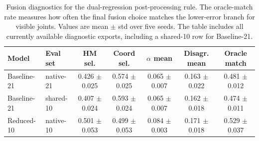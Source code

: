 \documentclass[10pt,letterpaper]{article}
\begin{document}
\begin{table}[H]
\centering
\footnotesize
\caption{Fusion diagnostics for the dual-regression post-processing rule. The oracle-match rate measures how often the final fusion choice matches the lower-error branch for visible joints. Values are mean $\pm$ std over five seeds. The table includes all currently available diagnostic exports, including a shared-10 row for Baseline-21.}
\label{tab:fusion_diagnostics}
\begin{tabular}{llccccc}
\toprule
Model & Eval set & HM sel. & Coord sel. & $\alpha$ mean & Disagr. mean & Oracle match \\
\midrule
Baseline-21 & native-21 & 0.426 $\pm$ 0.025 & 0.574 $\pm$ 0.025 & 0.065 $\pm$ 0.007 & 0.163 $\pm$ 0.022 & 0.481 $\pm$ 0.012 \\
Baseline-21 & shared-10 & 0.407 $\pm$ 0.024 & 0.593 $\pm$ 0.024 & 0.065 $\pm$ 0.007 & 0.162 $\pm$ 0.018 & 0.474 $\pm$ 0.011 \\
Reduced-10 & native-10 & 0.501 $\pm$ 0.053 & 0.499 $\pm$ 0.053 & 0.084 $\pm$ 0.003 & 0.171 $\pm$ 0.018 & 0.529 $\pm$ 0.037 \\
\bottomrule
\end{tabular}
\end{table}
\end{document}
